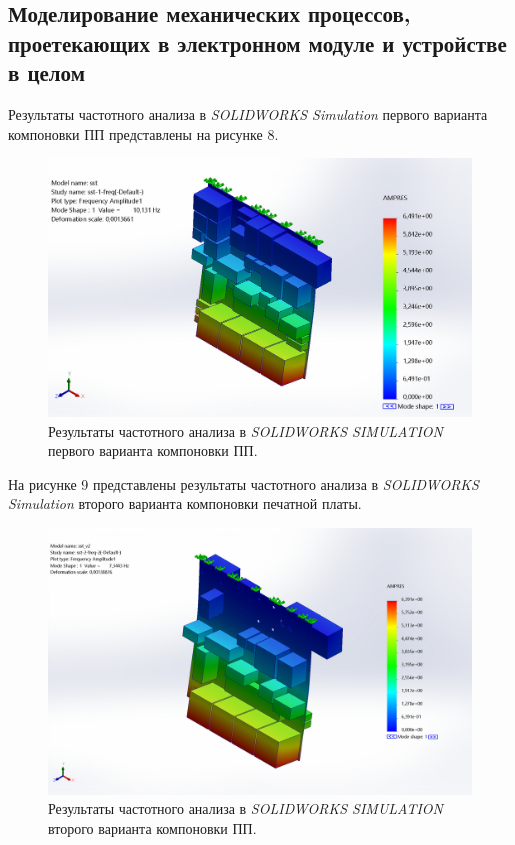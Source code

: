 \subsection{Моделирование механических процессов, проетекающих в электронном модуле и устройстве в целом}

Результаты частотного анализа в \textit{SOLIDWORKS Simulation} первого варианта компоновки ПП представлены на рисунке 8.

\begin{figure}[H]
  \centering
  \includegraphics[scale=0.3]{../img/sst-1/freq/top_view/sst-sst-1-freq-Amplitude-Amplitude1.jpg}
  \caption{Результаты частотного анализа в \textit{SOLIDWORKS SIMULATION} первого варианта компоновки ПП.}
\end{figure}


На рисунке 9 представлены результаты частотного анализа в \textit{SOLIDWORKS Simulation} второго варианта компоновки печатной платы.

\begin{figure}[H]
  \centering
  \includegraphics[scale = 0.3]{../img/sst-2/freq/sst_v2-sst-2-freq-2-Amplitude-Amplitude1.jpg}
  \caption{Результаты частотного анализа в \textit{SOLIDWORKS SIMULATION} второго варианта компоновки ПП.}

\end{figure}

